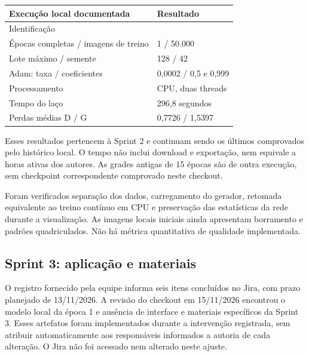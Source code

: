 \documentclass[12pt,a4paper]{article}
\begin{document}
\begin{center}
\begin{tabularx}{\textwidth}{@{}YY@{}}
\toprule
\textbf{Execução local documentada} & \textbf{Resultado} \\
\midrule
Identificação &  \\
Épocas completas / imagens de treino & 1 / 50.000 \\
Lote máximo / semente & 128 / 42 \\
Adam: taxa / coeficientes & 0,0002 / 0,5 e 0,999 \\
Processamento & CPU, duas threads \\
Tempo do laço & 296,8 segundos \\
Perdas médias D / G & 0,7726 / 1,5397 \\
\bottomrule
\end{tabularx}
\end{center}

Esses resultados pertencem à Sprint 2 e continuam sendo os últimos comprovados pelo histórico local. O tempo não inclui download e exportação, nem equivale a horas ativas dos autores. As grades antigas de 15 épocas são de outra execução, sem checkpoint correspondente comprovado neste checkout.

Foram verificados separação dos dados, carregamento do gerador, retomada equivalente ao treino contínuo em CPU e preservação das estatísticas da rede durante a visualização. As imagens locais iniciais ainda apresentam borramento e padrões quadriculados. Não há métrica quantitativa de qualidade implementada.

\subsection{Sprint 3: aplicação e materiais}
O registro fornecido pela equipe informa seis itens concluídos no Jira, com prazo planejado de 13/11/2026. A revisão do checkout em 15/11/2026 encontrou o modelo local da época 1 e ausência de interface e materiais específicos da Sprint 3. Esses artefatos foram implementados durante a intervenção registrada, sem atribuir automaticamente aos responsáveis informados a autoria de cada alteração. O Jira não foi acessado nem alterado neste ajuste.
\end{document}

